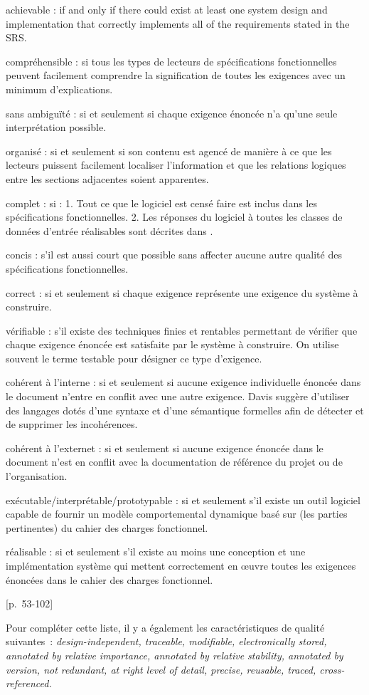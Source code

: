 {{\item [][---] achievable : \elide if and only if there could exist at least one system design and implementation that correctly implements all of the requirements stated in the SRS.
}{
\item [][---] compréhensible : \elide si tous les types de lecteurs de spécifications fonctionnelles peuvent facilement comprendre la signification de toutes les exigences avec un minimum d’explications.
\item [][---] sans ambiguïté : \elide si et seulement si chaque exigence énoncée n’a qu’une seule interprétation possible.
\item [][---] organisé : \elide si et seulement si son contenu est agencé de manière à ce que les lecteurs puissent facilement localiser l’information et que les relations logiques entre les sections adjacentes soient apparentes.
\item [][---] complet : \elide si :
1. Tout ce que le logiciel est censé faire est inclus dans les spécifications fonctionnelles.
2. Les réponses du logiciel à toutes les classes de données d’entrée réalisables sont décrites dans \elide.
\item [][---] concis : \elide s’il est aussi court que possible sans affecter aucune autre qualité des spécifications fonctionnelles.
\item [][---] correct : \elide si et seulement si chaque exigence représente une exigence du système à construire.
\item [][---] vérifiable : \elide s’il existe des techniques finies et rentables permettant de vérifier que chaque exigence énoncée est satisfaite par le système à construire. On utilise souvent le terme testable pour désigner ce type d’exigence.
\item [][---] cohérent à l'interne : \elide si et seulement si aucune exigence individuelle énoncée dans le document n’entre en conflit avec une autre exigence. Davis suggère d'utiliser des langages dotés d'une syntaxe et d'une sémantique formelles afin de détecter et de supprimer les incohérences.
\item [][---] cohérent à l'externet : \elide si et seulement si aucune exigence énoncée dans le document n’est en conflit avec la documentation de référence du projet ou de l’organisation.
\item [][---] exécutable/interprétable/prototypable : \elide si et seulement s’il existe un outil logiciel capable de fournir un modèle comportemental dynamique basé sur (les parties pertinentes) du cahier des charges fonctionnel.
\item [][---] réalisable : \elide si et seulement s’il existe au moins une conception et une implémentation système qui mettent correctement en œuvre toutes les exigences énoncées dans le cahier des charges fonctionnel.
}{[p.~53-102]}

Pour compléter cette liste, il y a également les caractéristiques de qualité suivantes~: \textit{design-independent, traceable, modifiable, electronically stored, annotated by relative importance, annotated by relative stability, annotated by version, not redundant, at right level of detail, precise, reusable, traced, cross-referenced.}
}{}


